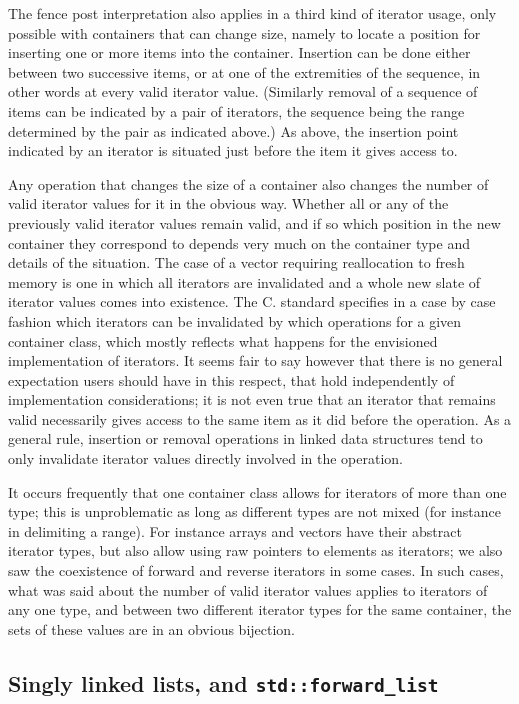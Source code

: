 \documentclass[12pt]{article}
\theoremstyle{plain}
\theoremstyle{definition}
\def\PP{\copy\PPbox}
\newcommand\Cee{\textsc{C}}
\newcommand\Cpp{\Cee\PP}
\newcommand\std[1]{\texttt{std::#1}}
\def\frwl.{\std{forward\_list}}
\begin{document}
The fence post interpretation also applies in a third kind of iterator usage,
only possible with containers that can change size, namely to locate a position
for inserting one or more items into the container. Insertion can be done either
between two successive items, or at one of the extremities of the sequence, in
other words at every valid iterator value. (Similarly removal of a sequence of
items can be indicated by a pair of iterators, the sequence being the range
determined by the pair as indicated above.) As above, the insertion point
indicated by an iterator is situated just before the item it gives access to.

Any operation that changes the size of a container also changes the number of
valid iterator values for it in the obvious way. Whether all or any of the
previously valid iterator values remain valid, and if so which position in the
new container they correspond to depends very much on the container type and
details of the situation. The case of a vector requiring reallocation to fresh
memory is one in which all iterators are invalidated and a whole new slate of
iterator values comes into existence. The \Cpp. standard specifies in a case by
case fashion which iterators can be invalidated by which operations for a given
container class, which mostly reflects what happens for the envisioned
implementation of iterators. It seems fair to say however that there is no
general expectation users should have in this respect, that hold independently
of implementation considerations; it is not even true that an iterator that
remains valid necessarily gives access to the same item as it did before the
operation. As a general rule, insertion or removal operations in linked data
structures tend to only invalidate iterator values directly involved
in the operation.

It occurs frequently that one container class allows for iterators of more than
one type; this is unproblematic as long as different types are not mixed (for
instance in delimiting a range). For instance arrays and vectors have their
abstract iterator types, but also allow using raw pointers to elements as
iterators; we also saw the coexistence of forward and reverse iterators in some
cases. In such cases, what was said about the number of valid iterator values
applies to iterators of any one type, and between two different iterator types
for the same container, the sets of these values are in an obvious bijection.

\subsection{Singly linked lists, and \frwl.}
\end{document}
